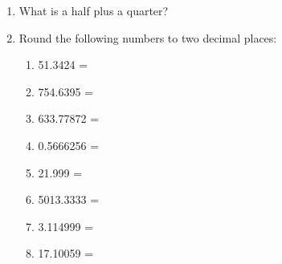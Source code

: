 \documentclass[a4paper]{article}
\begin{document}
\begin{enumerate}
\item What is a half plus a quarter? 
\item Round the following numbers to two decimal places: 
  \begin{enumerate}
    \item 51.3424 = 
    \item 754.6395 = 
    \item 633.77872 = 
    \item 0.5666256 = 
    \item 21.999 = 
    \item 5013.3333 = 
    \item 3.114999 = 
    \item 17.10059 = 
  \end{enumerate}
\end{enumerate}
\newpage
\end{document}

